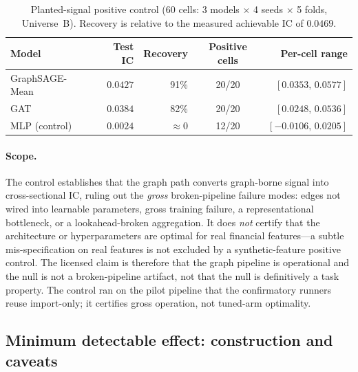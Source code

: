 \documentclass{article}
\begin{document}
\begin{table}[h]
  \centering
  \caption{Planted-signal positive control (60 cells: 3 models $\times$ 4 seeds
  $\times$ 5 folds, Universe~B). Recovery is relative to the measured achievable
  IC of $0.0469$.}
  \label{app:robust:tab-planted}
  \begin{tabular}{@{}lrrcr@{}}
    \toprule
    Model & Test IC & Recovery & Positive cells & Per-cell range \\
    \midrule
    GraphSAGE-Mean & $0.0427$ & 91\% & 20/20 & $[0.0353,\,0.0577]$ \\
    GAT            & $0.0384$ & 82\% & 20/20 & $[0.0248,\,0.0536]$ \\
    MLP (control)  & $0.0024$ & ${\approx}0$ & 12/20 & $[-0.0106,\,0.0205]$ \\
    \bottomrule
  \end{tabular}
\end{table}

\paragraph{Scope.}
The control establishes that the graph path converts graph-borne signal into
cross-sectional IC, ruling out the \emph{gross} broken-pipeline failure modes:
edges not wired into learnable parameters, gross training failure, a
representational bottleneck, or a lookahead-broken aggregation. It does
\emph{not} certify that the architecture or hyperparameters are optimal for real
financial features---a subtle mis-specification on real features is not excluded
by a synthetic-feature positive control. The licensed claim is therefore that
the graph pipeline is operational and the null is not a broken-pipeline
artifact, not that the null is definitively a task property. The control ran on
the pilot pipeline that the confirmatory runners reuse import-only; it certifies
gross operation, not tuned-arm optimality.

\subsection{Minimum detectable effect: construction and caveats}\label{app:robust:mde}
\end{document}
